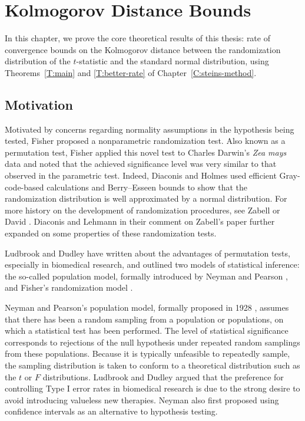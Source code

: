 \chapter{Kolmogorov Distance Bounds}
\label{C:stein-proof} In this chapter, we prove the core theoretical
results of this thesis: rate of convergence bounds on the Kolmogorov
distance between the randomization distribution of the $t$-statistic
and the standard normal distribution, using
Theorems~\ref{T:main} and \ref{T:better-rate} of Chapter~\ref{C:steins-method}.

\section{Motivation}
Motivated by concerns regarding normality assumptions in the
hypothesis being tested, Fisher \cite{fisher1935design} proposed a
nonparametric randomization test.  Also known as a permutation test,
Fisher applied this novel test to Charles Darwin's \emph{Zea mays}
data and noted that the achieved significance level was very similar
to that observed in the parametric test.  Indeed, Diaconis and Holmes
\cite{diaconis1994gray} used efficient Gray-code-based calculations
and Berry--Esseen bounds to show that the randomization distribution
is well approximated by a normal distribution.  For more history on
the development of randomization procedures, see Zabell
\cite{zabell2008student} or David \cite{david2008beginnings}.
Diaconis and Lehmann \cite{diaconis2008comment} in their comment on
Zabell's paper further expanded on some properties of these
randomization tests.

Ludbrook and Dudley \cite{ludbrook1998permutation} have written about
the advantages of permutation tests, especially in biomedical
research, and outlined two models of statistical inference: the
so-called population model, formally introduced by Neyman and Pearson
\cite{neyman1928use}, and Fisher's randomization model
\cite{fisher1935design}.

Neyman and Pearson's population model, formally proposed in 1928
\cite{neyman1928use}, assumes that there has been a random sampling
from a population or populations, on which a statistical test has been
performed.  The level of statistical significance corresponds to
rejections of the null hypothesis under repeated random samplings from
these populations.  Because it is typically unfeasible to repeatedly
sample, the sampling distribution is taken to conform to a theoretical
distribution such as the $t$ or $F$ distributions.  Ludbrook and
Dudley argued that the preference for controlling Type I error rates
in biomedical research is due to the strong desire to avoid introducing
valueless new therapies.  Neyman \cite{neyman1934two} also first proposed
using confidence intervals as an alternative to hypothesis testing.

